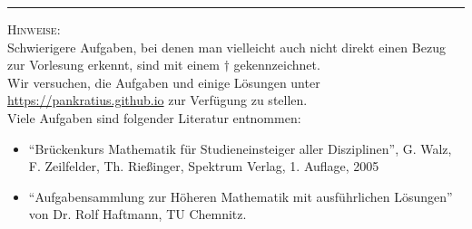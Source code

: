 \documentclass[11pt]{article}
\begin{document}
\hrule
\vspace{.5cm}
\noindent
\textsc{Hinweise:}\\
Schwierigere Aufgaben, bei denen man vielleicht auch nicht direkt einen Bezug zur Vorlesung erkennt, sind mit einem $\dagger$ gekennzeichnet.\\
Wir versuchen, die Aufgaben und einige Lösungen unter \url{https://pankratius.github.io} zur Verfügung zu stellen.\\
Viele Aufgaben sind folgender Literatur entnommen:
\begin{itemize}
	\item ``Br\"uckenkurs Mathematik f\"ur Studieneinsteiger aller Disziplinen'', G. Walz, F. Zeilfelder, Th. Rie\ss inger, Spektrum Verlag, 1. Auflage, 2005
	\item ``Aufgabensammlung zur H\"oheren Mathematik mit ausf\"uhrlichen L\"osungen'' von Dr. Rolf Haftmann, TU Chemnitz.
\end{itemize}
\end{document}
